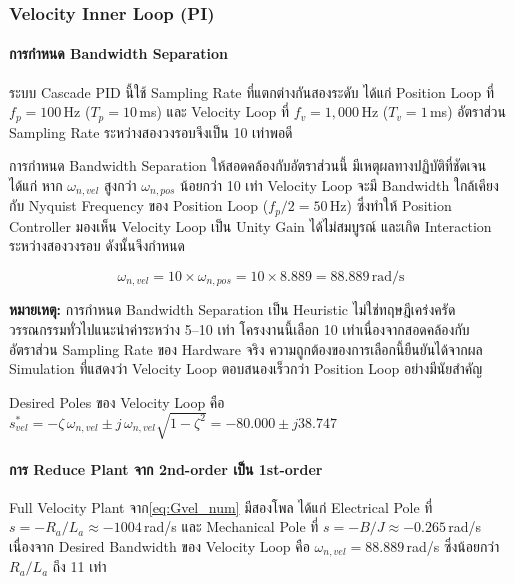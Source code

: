 \subsubsection{Velocity Inner Loop (PI)}

\paragraph{การกำหนด Bandwidth Separation}

ระบบ Cascade PID นี้ใช้ Sampling Rate ที่แตกต่างกันสองระดับ
ได้แก่ Position Loop ที่ $f_{p} = 100$\,Hz ($T_p = 10$\,ms)
และ Velocity Loop ที่ $f_{v} = 1{,}000$\,Hz ($T_v = 1$\,ms)
อัตราส่วน Sampling Rate ระหว่างสองวงรอบจึงเป็น 10 เท่าพอดี

การกำหนด Bandwidth Separation ให้สอดคล้องกับอัตราส่วนนี้
มีเหตุผลทางปฏิบัติที่ชัดเจน ได้แก่
หาก $\omega_{n,vel}$ สูงกว่า $\omega_{n,pos}$ น้อยกว่า 10 เท่า
Velocity Loop จะมี Bandwidth ใกล้เคียงกับ
Nyquist Frequency ของ Position Loop ($f_{p}/2 = 50$\,Hz)
ซึ่งทำให้ Position Controller มองเห็น Velocity Loop
เป็น Unity Gain ได้ไม่สมบูรณ์
และเกิด Interaction ระหว่างสองวงรอบ
ดังนั้นจึงกำหนด

\begin{equation}
    \omega_{n,vel} = 10 \times \omega_{n,pos}
                  = 10 \times 8.889
                  = 88.889\,\text{rad/s}
    \label{eq:bw_sep}
\end{equation}

\textbf{หมายเหตุ:} การกำหนด Bandwidth Separation เป็น Heuristic
ไม่ใช่ทฤษฎีเคร่งครัด วรรณกรรมทั่วไปแนะนำค่าระหว่าง 5--10 เท่า
โครงงานนี้เลือก 10 เท่าเนื่องจากสอดคล้องกับอัตราส่วน
Sampling Rate ของ Hardware จริง
ความถูกต้องของการเลือกนี้ยืนยันได้จากผล Simulation
ที่แสดงว่า Velocity Loop ตอบสนองเร็วกว่า Position Loop
อย่างมีนัยสำคัญ

Desired Poles ของ Velocity Loop คือ
$s^*_{vel} = -\zeta\,\omega_{n,vel} \pm j\,\omega_{n,vel}\sqrt{1-\zeta^2}
           = -80.000 \pm j38.747$

\paragraph{การ Reduce Plant จาก 2nd-order เป็น 1st-order}

Full Velocity Plant จาก\cref{eq:Gvel_num} มีสองโพล ได้แก่
Electrical Pole ที่ $s = -R_a/L_a \approx -1004$\,rad/s
และ Mechanical Pole ที่ $s = -B/J \approx -0.265$\,rad/s
เนื่องจาก Desired Bandwidth ของ Velocity Loop คือ
$\omega_{n,vel} = 88.889$\,rad/s ซึ่งน้อยกว่า
$R_a/L_a$ ถึง 11 เท่า

